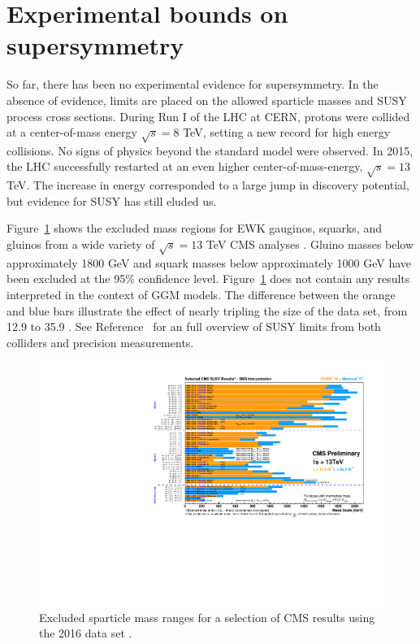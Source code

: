 \section{Experimental bounds on supersymmetry}
\label{sec:SUSYlimits}

So far, there has been no experimental evidence for supersymmetry. In the absence of evidence, limits
are placed on the allowed sparticle masses and SUSY process cross sections. 
During Run I of the LHC at CERN,
protons were collided at a center-of-mass energy $\sqrt{s} = 8$ TeV, setting a new record for high energy
collisions. No signs of physics beyond the standard model were observed. In 2015, the LHC successfully 
restarted at an even higher center-of-mass-energy, $\sqrt{s} = 13$ TeV. The increase in energy corresponded
to a large jump in discovery potential, but evidence for SUSY has still eluded us. 

Figure~\ref{fig:CMSexclusions} shows the excluded mass regions for EWK gauginos, squarks, and gluinos
from a wide variety of $\sqrt{s} = 13$ TeV CMS analyses \cite{SUSYtwiki}. Gluino masses below approximately 1800 GeV and 
squark masses below approximately 1000 GeV have been excluded at the 95\% confidence level. 
Figure~\ref{fig:CMSexclusions} does not contain any results interpreted in the context of GGM models.
The difference between the orange and blue bars illustrate the effect of nearly tripling the size of the
data set, from 12.9 \fbinv to 35.9 \fbinv. See Reference~\cite{pdgReview} for an full overview of SUSY 
limits from both colliders and precision measurements.

\begin{figure}[htbp]
    \centering
    \includegraphics[angle=90,origin=c,width=.9\textwidth]{Figures/Theory/Moriond2017_BarPlot.pdf}
    \caption{ Excluded sparticle mass ranges for a selection of CMS results using the 2016 data set \cite{SUSYtwiki}.}
    \label{fig:CMSexclusions}
\end{figure}

